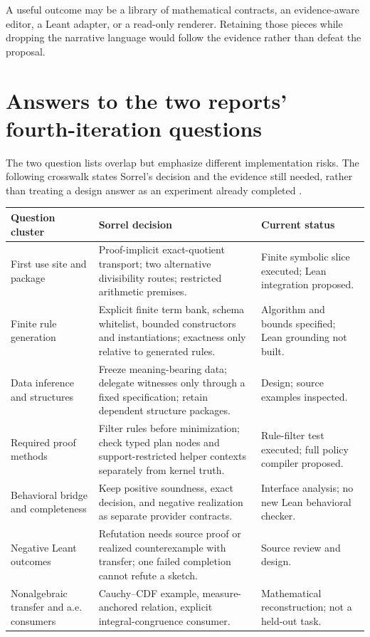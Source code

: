 \documentclass[11pt,a4paper]{article}
\numberwithin{equation}{section}
\theoremstyle{definition}\newtheorem{definition}[theorem]{Definition}
\theoremstyle{remark}\newtheorem{remark}[theorem]{Remark}
\begin{document}
A useful outcome may be a library of mathematical contracts, an evidence-aware
editor, a Leant adapter, or a read-only renderer. Retaining those pieces while
dropping the narrative language would follow the evidence rather than defeat
the proposal.

\section{Answers to the two reports' fourth-iteration questions}\label{sec:crosswalk}
The two question lists overlap but emphasize different implementation risks.
The following crosswalk states Sorrel's decision and the evidence still needed,
rather than treating a design answer as an experiment already completed
\cite{synA,synB}.
\begin{center}\small
\begin{longtable}{@{}P{34mm}P{70mm}P{39mm}@{}}\toprule
Question cluster & Sorrel decision & Current status\\\midrule\endhead
First use site and package & Proof-implicit exact-quotient transport; two alternative divisibility routes; restricted arithmetic premises. & Finite symbolic slice executed; Lean integration proposed.\\
Finite rule generation & Explicit finite term bank, schema whitelist, bounded constructors and instantiations; exactness only relative to generated rules. & Algorithm and bounds specified; Lean grounding not built.\\
Data inference and structures & Freeze meaning-bearing data; delegate witnesses only through a fixed specification; retain dependent structure packages. & Design; source examples inspected.\\
Required proof methods & Filter rules before minimization; check typed plan nodes and support-restricted helper contexts separately from kernel truth. & Rule-filter test executed; full policy compiler proposed.\\
Behavioral bridge and completeness & Keep positive soundness, exact decision, and negative realization as separate provider contracts. & Interface analysis; no new Lean behavioral checker.\\
Negative Leant outcomes & Refutation needs source proof or realized counterexample with transfer; one failed completion cannot refute a sketch. & Source review and design.\\
Nonalgebraic transfer and a.e. consumers & Cauchy--CDF example, measure-anchored relation, explicit integral-congruence consumer. & Mathematical reconstruction; not a held-out task.\\

\end{longtable}
\end{center}
\end{document}
